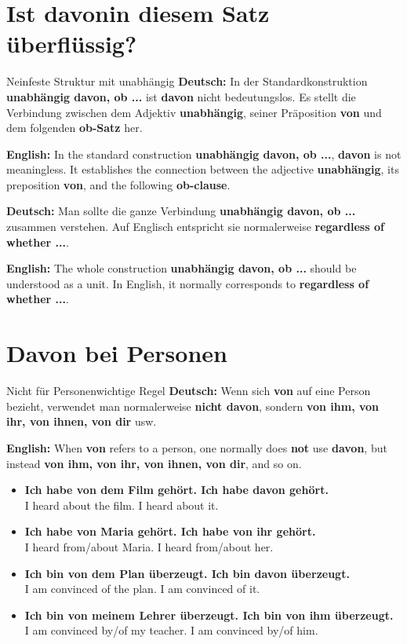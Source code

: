 \documentclass[a4paper,11pt]{article}
\newcommand{\GermanText}[1]{\textbf{Deutsch: }#1\par}
\newcommand{\EnglishText}[1]{{\small\color{SoftGray}\textbf{English: }#1\par}}
\newcommand{\ExampleItem}[2]{\item \textbf{#1}\\{\small\color{SoftGray}#2}}
\begin{document}
    \section{Ist \glqq davon\grqq in diesem Satz überflüssig?}

        \begin{grammarentry}{Nein}{feste Struktur mit unabhängig}
            \GermanText{In der Standardkonstruktion \textbf{unabhängig davon, ob ...} ist \textbf{davon} nicht bedeutungslos. Es stellt die Verbindung zwischen dem Adjektiv \textbf{unabhängig}, seiner Präposition \textbf{von} und dem folgenden \textbf{ob-Satz} her.}
            \EnglishText{In the standard construction \textbf{unabhängig davon, ob ...}, \textbf{davon} is not meaningless. It establishes the connection between the adjective \textbf{unabhängig}, its preposition \textbf{von}, and the following \textbf{ob-clause}.}

            \GermanText{Man sollte die ganze Verbindung \textbf{unabhängig davon, ob ...} zusammen verstehen. Auf Englisch entspricht sie normalerweise \textbf{regardless of whether ...}.}
            \EnglishText{The whole construction \textbf{unabhängig davon, ob ...} should be understood as a unit. In English, it normally corresponds to \textbf{regardless of whether ...}.}
        \end{grammarentry}

    \section{Davon bei Personen}

        \begin{grammarentry}{Nicht für Personen}{wichtige Regel}
            \GermanText{Wenn sich \textbf{von} auf eine Person bezieht, verwendet man normalerweise \textbf{nicht davon}, sondern \textbf{von ihm, von ihr, von ihnen, von dir} usw.}
            \EnglishText{When \textbf{von} refers to a person, one normally does \textbf{not} use \textbf{davon}, but instead \textbf{von ihm, von ihr, von ihnen, von dir}, and so on.}
        \end{grammarentry}

        \begin{exbox}
            \begin{itemize}
                \ExampleItem{Ich habe von dem Film gehört. \textrightarrow{} Ich habe davon gehört.}{I heard about the film. \textrightarrow{} I heard about it.}
                \ExampleItem{Ich habe von Maria gehört. \textrightarrow{} Ich habe von ihr gehört.}{I heard from/about Maria. \textrightarrow{} I heard from/about her.}
                \ExampleItem{Ich bin von dem Plan überzeugt. \textrightarrow{} Ich bin davon überzeugt.}{I am convinced of the plan. \textrightarrow{} I am convinced of it.}
                \ExampleItem{Ich bin von meinem Lehrer überzeugt. \textrightarrow{} Ich bin von ihm überzeugt.}{I am convinced by/of my teacher. \textrightarrow{} I am convinced by/of him.}
            \end{itemize}
        \end{exbox}
\end{document}
